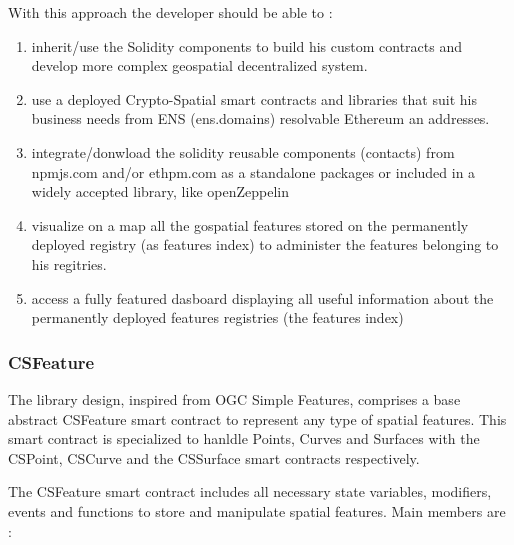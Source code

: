 \documentclass{isprs} %
\begin{document}
With this approach the developer should be able to : 

\begin{enumerate}
\setlength\itemsep{0em}\setlength\parskip{0em}\setlength\topsep{0em}\setlength\partopsep{0em}\setlength\parsep{0em} 
\item{inherit/use the Solidity components to build his custom contracts and develop more complex geospatial decentralized system.} 
\item{use a deployed Crypto-Spatial smart contracts and libraries that suit his business needs from ENS (ens.domains) resolvable Ethereum an addresses.}
\item{integrate/donwload the solidity reusable components (contacts) from npmjs.com and/or ethpm.com as a standalone packages or included in a widely accepted library, like openZeppelin \cite{openzeppelin}}
\item{visualize on a map all the gospatial features stored on the permanently deployed registry (as features index) to administer the features belonging to his regitries.}
\item{access a fully featured dasboard displaying all useful information about the permanently deployed features registries (the features index)}
\end{enumerate}

\subsubsection{CSFeature}\label{sec:CSFeature}

The library design, inspired from OGC Simple Features, comprises a base abstract CSFeature smart contract to represent any type of spatial features. This smart contract is specialized to hanldle Points, Curves and Surfaces with the CSPoint, CSCurve and the CSSurface smart contracts respectively.

The CSFeature smart contract includes all necessary state variables, modifiers, events and functions to store and manipulate spatial features. Main members are :
\end{document}
